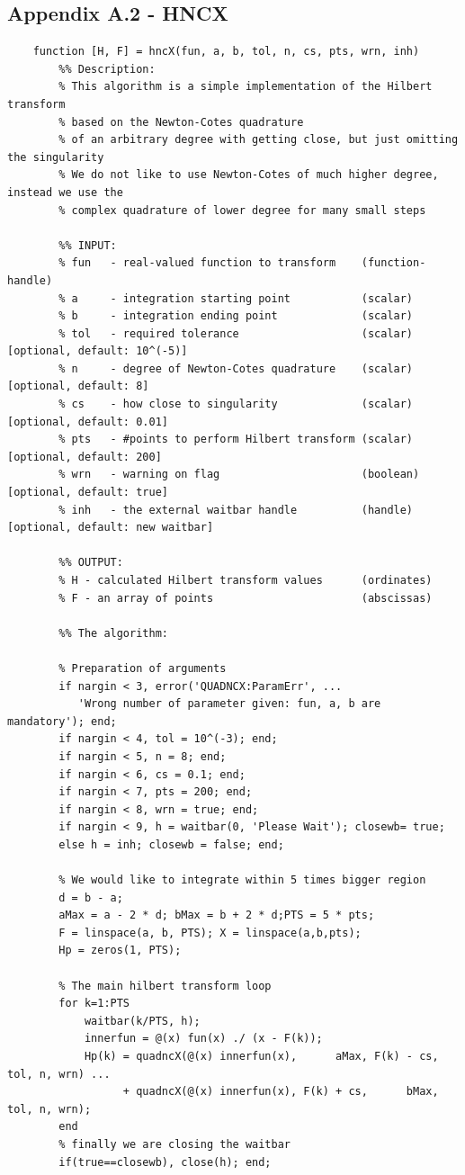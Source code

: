 \documentclass[12pt,twoside,a4paper]{article}
\numberwithin{equation}{subsection}
\numberwithin{figure}{subsection}
\begin{document}
\subsection*{Appendix A.2 - HNCX}
\begin{lstlisting}
	function [H, F] = hncX(fun, a, b, tol, n, cs, pts, wrn, inh)
	    %% Description:
	    % This algorithm is a simple implementation of the Hilbert transform 
	    % based on the Newton-Cotes quadrature
	    % of an arbitrary degree with getting close, but just omitting the singularity
	    % We do not like to use Newton-Cotes of much higher degree, instead we use the
	    % complex quadrature of lower degree for many small steps  
	    
	    %% INPUT:
	    % fun   - real-valued function to transform    (function-handle)
	    % a     - integration starting point           (scalar)
	    % b     - integration ending point             (scalar)
	    % tol   - required tolerance                   (scalar)  [optional, default: 10^(-5)]
	    % n     - degree of Newton-Cotes quadrature    (scalar)  [optional, default: 8]
	    % cs    - how close to singularity             (scalar)  [optional, default: 0.01]
	    % pts   - #points to perform Hilbert transform (scalar)  [optional, default: 200]
	    % wrn   - warning on flag                      (boolean) [optional, default: true]
	    % inh   - the external waitbar handle          (handle)  [optional, default: new waitbar]
	    
	    %% OUTPUT:
	    % H - calculated Hilbert transform values      (ordinates)
	    % F - an array of points                       (abscissas) 
	    
	    %% The algorithm:
	    
	    % Preparation of arguments
	    if nargin < 3, error('QUADNCX:ParamErr', ...
	       'Wrong number of parameter given: fun, a, b are mandatory'); end;
	    if nargin < 4, tol = 10^(-3); end;
	    if nargin < 5, n = 8; end;
	    if nargin < 6, cs = 0.1; end;
	    if nargin < 7, pts = 200; end;
	    if nargin < 8, wrn = true; end;
	    if nargin < 9, h = waitbar(0, 'Please Wait'); closewb= true; 
	    else h = inh; closewb = false; end;
	    
	    % We would like to integrate within 5 times bigger region
	    d = b - a;
	    aMax = a - 2 * d; bMax = b + 2 * d;PTS = 5 * pts;
	    F = linspace(a, b, PTS); X = linspace(a,b,pts);
	    Hp = zeros(1, PTS);
	    
	    % The main hilbert transform loop
	    for k=1:PTS
	        waitbar(k/PTS, h);
	        innerfun = @(x) fun(x) ./ (x - F(k));
	        Hp(k) = quadncX(@(x) innerfun(x),      aMax, F(k) - cs, tol, n, wrn) ...
	              + quadncX(@(x) innerfun(x), F(k) + cs,      bMax, tol, n, wrn);
	    end
	    % finally we are closing the waitbar
	    if(true==closewb), close(h); end;
	    

\end{lstlisting}
\end{document}
